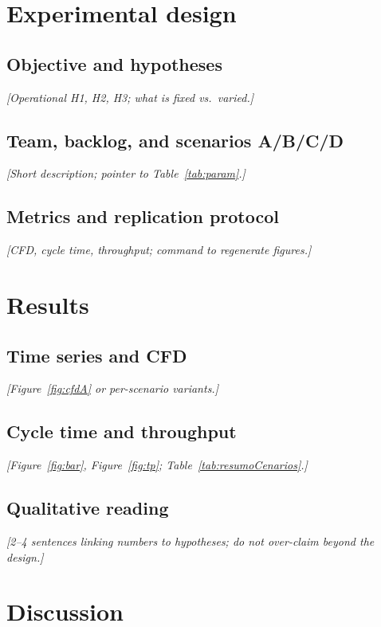 \section{Experimental design}
\label{sec:experimentos}

\subsection{Objective and hypotheses}
\textit{[Operational H1, H2, H3; what is fixed vs.\ varied.]}

\subsection{Team, backlog, and scenarios A/B/C/D}
\textit{[Short description; pointer to Table~\ref{tab:param}.]}

\subsection{Metrics and replication protocol}
\textit{[CFD, cycle time, throughput; command to regenerate figures.]}

\section{Results}
\label{sec:resultados}

\subsection{Time series and CFD}
\textit{[Figure~\ref{fig:cfdA} or per-scenario variants.]}

\subsection{Cycle time and throughput}
\textit{[Figure~\ref{fig:bar}, Figure~\ref{fig:tp}; Table~\ref{tab:resumoCenarios}.]}

\subsection{Qualitative reading}
\textit{[2--4 sentences linking numbers to hypotheses; do not over-claim beyond the design.]}

\section{Discussion}
\label{sec:discussao}

